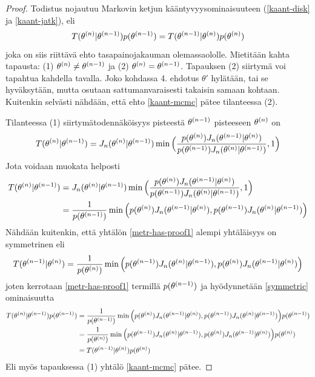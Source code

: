 \begin{proof}

Todistus nojautuu Markovin ketjun kääntyvyysominaisuuteen (\ref{kaant-disk} ja \ref{kaant-jatk}), eli
	\begin{equation}\label{kaant-mcmc}
		T(\theta^{(n)}|\theta^{(n-1)})p(\theta^{(n-1)}) = T(\theta^{(n-1)}|\theta^{(n)})p(\theta^{(n)})
	\end{equation}
	joka on siis riittävä ehto tasapainojakauman olemassaololle. Mietitään kahta tapausta: (1) $\theta^{(n)} \neq \theta^{(n-1)}$ ja (2) $\theta^{(n)} = \theta^{(n-1)}$.
	Tapauksen (2) siirtymä voi tapahtua kahdella tavalla. Joko kohdassa 4. ehdotus $\theta'$ hylätään, tai se hyväksytään, mutta osutaan sattumanvaraisesti takaisin samaan kohtaan. Kuitenkin selvästi nähdään, että ehto \ref{kaant-mcmc} pätee tilanteessa (2).
	
	Tilanteessa (1) siirtymätodennäköisyys pisteestä $\theta^{(n-1)}$ pisteeseen $\theta^{(n)}$ on
	\begin{equation}
		T(\theta^{(n)}|\theta^{(n-1)}) = J_n(\theta^{(n)}|\theta^{(n-1)})
		\min\Big( \frac{p(\theta^{(n)})J_n(\theta^{(n-1)}|\theta^{(n)})}{p(\theta^{(n-1)})J_n(\theta^{(n)}|\theta^{(n-1)})},1 \Big)
	\end{equation}
	Jota voidaan muokata helposti
	\begin{equation}\label{metr-has-proof1}
		\begin{split}
			T(\theta^{(n)}|\theta^{(n-1)}) &= J_n(\theta^{(n)}|\theta^{(n-1)})
		\min\Big( \frac{p(\theta^{(n)})J_n(\theta^{(n-1)}|\theta^{(n)})}{p(\theta^{(n-1)})J_n(\theta^{(n)}|\theta^{(n-1)})},1 \Big) \\
		&= \frac{1}{p(\theta^{(n-1)})} \min \Big( p(\theta^{(n)})J_n(\theta^{(n-1)}|\theta^{(n)}) , p(\theta^{(n-1)})J_n(\theta^{(n)}|\theta^{(n-1)})  \Big)
		\end{split}
	\end{equation}
	Nähdään kuitenkin, että yhtälön \ref{metr-has-proof1} alempi yhtäläisyys on symmetrinen eli
	\begin{equation}\label{symmetric}
		T(\theta^{(n-1)}|\theta^{(n)})=\frac{1}{p(\theta^{(n)})} \min \Big( p(\theta^{(n-1)})J_n(\theta^{(n)}|\theta^{(n-1)}) , p(\theta^{(n)})J_n(\theta^{(n-1)}|\theta^{(n)})  \Big)
	\end{equation}
	joten kerrotaan \ref{metr-has-proof1} termillä $p(\theta^{(n-1)})$ ja hyödynnetään \ref{symmetric} ominaisuutta
	\begin{equation*}
	\begin{split}
		T(\theta^{(n)}|\theta^{(n-1)})p(\theta^{(n-1)}) &= \frac{1}{p(\theta^{(n-1)})} \min \Big( p(\theta^{(n)})J_n(\theta^{(n-1)}|\theta^{(n)}) , p(\theta^{(n-1)})J_n(\theta^{(n)}|\theta^{(n-1)})  \Big) p(\theta^{(n-1)}) \\
		&= \frac{1}{p(\theta^{(n)})} \min \Big( p(\theta^{(n-1)})J_n(\theta^{(n)}|\theta^{(n-1)}) , p(\theta^{(n)})J_n(\theta^{(n-1)}|\theta^{(n)})  \Big) p(\theta^{(n)}) \\
		&= T(\theta^{(n-1)}|\theta^{(n)})p(\theta^{(n)})
	\end{split}
	\end{equation*}
	Eli myös tapauksessa (1) yhtälö \ref{kaant-mcmc} pätee.
\end{proof}

